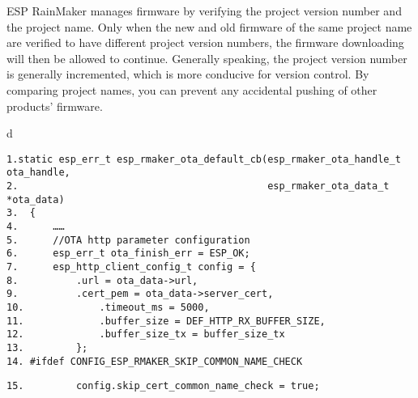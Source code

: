\documentclass[a4paper,12pt]{book}
\begin{document}
ESP RainMaker manages firmware by verifying the project version number and the project name. Only when the new and old firmware of the same project name are verified to have different project version numbers, the firmware downloading will then be allowed to continue. Generally speaking, the project version number is generally incremented, which is more conducive for version control. By comparing project names, you can prevent any accidental pushing of other products’ firmware.

\begin{codebloc}
\begin{tabular}{d}
\vspace{2pt}
\begin{verbatim}
1.static esp_err_t esp_rmaker_ota_default_cb(esp_rmaker_ota_handle_t ota_handle,
2.                                           esp_rmaker_ota_data_t *ota_data)
3.  {
4.      ……
5.      //OTA http parameter configuration
6.      esp_err_t ota_finish_err = ESP_OK;
7.      esp_http_client_config_t config = {
8.          .url = ota_data->url,
9.          .cert_pem = ota_data->server_cert,
10.             .timeout_ms = 5000,
11.             .buffer_size = DEF_HTTP_RX_BUFFER_SIZE,
12.             .buffer_size_tx = buffer_size_tx
13.         };
14. #ifdef CONFIG_ESP_RMAKER_SKIP_COMMON_NAME_CHECK
\end{verbatim}
\verb|15.         config.skip_cert_common_name_check = true;|
\end{tabular}
\end{codebloc}
\end{document}
